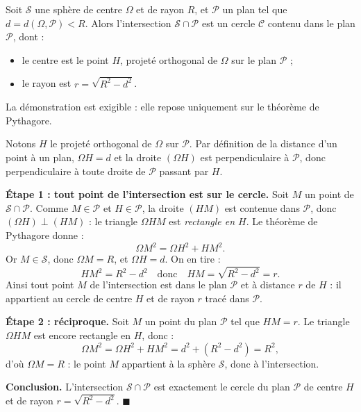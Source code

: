 \documentclass[11pt]{article}
\newcommand{\cle}[1]{{\popxbold\color{popdark}#1}}
\begin{document}
\begin{propriete}
Soit $\mathcal{S}$ une sphère de centre $\Omega$ et de rayon $R$, et $\mathcal{P}$ un plan tel que $d = d(\Omega, \mathcal{P}) < R$. Alors l'intersection $\mathcal{S} \cap \mathcal{P}$ est un \cle{cercle} $\mathcal{C}$ contenu dans le plan $\mathcal{P}$, dont :
\begin{itemize}
\item le \cle{centre} est le point $H$, \cle{projeté orthogonal} de $\Omega$ sur le plan $\mathcal{P}$ ;
\item le \cle{rayon} est $r = \sqrt{R^{2} - d^{2}}$.
\end{itemize}
La démonstration est exigible : elle repose uniquement sur le théorème de Pythagore.
\end{propriete}

\begin{experience}
Notons $H$ le projeté orthogonal de $\Omega$ sur $\mathcal{P}$. Par définition de la distance d'un point à un plan, $\Omega H = d$ et la droite $(\Omega H)$ est perpendiculaire à $\mathcal{P}$, donc perpendiculaire à toute droite de $\mathcal{P}$ passant par $H$.

\textbf{Étape 1 : tout point de l'intersection est sur le cercle.} Soit $M$ un point de $\mathcal{S} \cap \mathcal{P}$. Comme $M \in \mathcal{P}$ et $H \in \mathcal{P}$, la droite $(HM)$ est contenue dans $\mathcal{P}$, donc $(\Omega H) \perp (HM)$ : le triangle $\Omega HM$ est \emph{rectangle en $H$}. Le théorème de Pythagore donne :
\[ \Omega M^{2} = \Omega H^{2} + HM^{2}. \]
Or $M \in \mathcal{S}$, donc $\Omega M = R$, et $\Omega H = d$. On en tire :
\[ HM^{2} = R^{2} - d^{2} \quad \text{donc} \quad HM = \sqrt{R^{2} - d^{2}} = r. \]
Ainsi tout point $M$ de l'intersection est dans le plan $\mathcal{P}$ et à distance $r$ de $H$ : il appartient au cercle de centre $H$ et de rayon $r$ tracé dans $\mathcal{P}$.

\textbf{Étape 2 : réciproque.} Soit $M$ un point du plan $\mathcal{P}$ tel que $HM = r$. Le triangle $\Omega HM$ est encore rectangle en $H$, donc :
\[ \Omega M^{2} = \Omega H^{2} + HM^{2} = d^{2} + (R^{2} - d^{2}) = R^{2}, \]
d'où $\Omega M = R$ : le point $M$ appartient à la sphère $\mathcal{S}$, donc à l'intersection.

\textbf{Conclusion.} L'intersection $\mathcal{S} \cap \mathcal{P}$ est exactement le cercle du plan $\mathcal{P}$ de centre $H$ et de rayon $r = \sqrt{R^{2} - d^{2}}$. $\blacksquare$
\end{experience}
\end{document}
